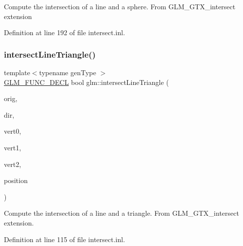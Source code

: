 Compute the intersection of a line and a sphere. From G\+L\+M\+\_\+\+G\+T\+X\+\_\+intersect extension 

Definition at line 192 of file intersect.\+inl.

\mbox{\label{group__gtx__intersect_ga9d29b9b3acb504d43986502f42740df4}} 
\subsubsection{\texorpdfstring{intersect\+Line\+Triangle()}{intersectLineTriangle()}}
{\footnotesize\ttfamily template$<$typename gen\+Type $>$ \\
\hyperlink{setup_8hpp_ab2d052de21a70539923e9bcbf6e83a51}{G\+L\+M\+\_\+\+F\+U\+N\+C\+\_\+\+D\+E\+CL} bool glm\+::intersect\+Line\+Triangle (\begin{DoxyParamCaption}\item[{gen\+Type const \&}]{orig,  }\item[{gen\+Type const \&}]{dir,  }\item[{gen\+Type const \&}]{vert0,  }\item[{gen\+Type const \&}]{vert1,  }\item[{gen\+Type const \&}]{vert2,  }\item[{gen\+Type \&}]{position }\end{DoxyParamCaption})}

Compute the intersection of a line and a triangle. From G\+L\+M\+\_\+\+G\+T\+X\+\_\+intersect extension. 

Definition at line 115 of file intersect.\+inl.

\mbox{\label{group__gtx__intersect_gad3697a9700ea379739a667ea02573488}} 
